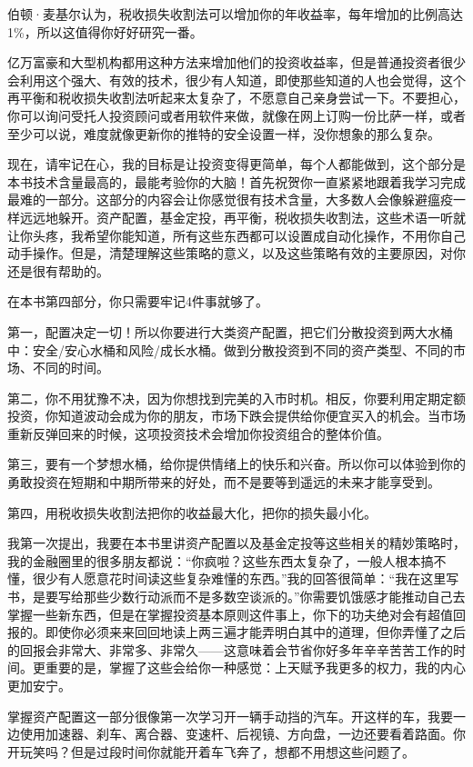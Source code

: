 伯顿·麦基尔认为，税收损失收割法可以增加你的年收益率，每年增加的比例高达1\%，所以这值得你好好研究一番。

亿万富豪和大型机构都用这种方法来增加他们的投资收益率，但是普通投资者很少会利用这个强大、有效的技术，很少有人知道，即使那些知道的人也会觉得，这个再平衡和税收损失收割法听起来太复杂了，不愿意自己亲身尝试一下。不要担心，你可以询问受托人投资顾问或者用软件来做，就像在网上订购一份比萨一样，或者至少可以说，难度就像更新你的推特的安全设置一样，没你想象的那么复杂。

现在，请牢记在心，我的目标是让投资变得更简单，每个人都能做到，这个部分是本书技术含量最高的，最能考验你的大脑！首先祝贺你一直紧紧地跟着我学习完成最难的一部分。这部分的内容会让你感觉很有技术含量，大多数人会像躲避瘟疫一样远远地躲开。资产配置，基金定投，再平衡，税收损失收割法，这些术语一听就让你头疼，我希望你能知道，所有这些东西都可以设置成自动化操作，不用你自己动手操作。但是，清楚理解这些策略的意义，以及这些策略有效的主要原因，对你还是很有帮助的。

在本书第四部分，你只需要牢记4件事就够了。

第一，配置决定一切！所以你要进行大类资产配置，把它们分散投资到两大水桶中：安全/安心水桶和风险/成长水桶。做到分散投资到不同的资产类型、不同的市场、不同的时间。

第二，你不用犹豫不决，因为你想找到完美的入市时机。相反，你要利用定期定额投资，你知道波动会成为你的朋友，市场下跌会提供给你便宜买入的机会。当市场重新反弹回来的时候，这项投资技术会增加你投资组合的整体价值。

第三，要有一个梦想水桶，给你提供情绪上的快乐和兴奋。所以你可以体验到你的勇敢投资在短期和中期所带来的好处，而不是要等到遥远的未来才能享受到。

第四，用税收损失收割法把你的收益最大化，把你的损失最小化。

我第一次提出，我要在本书里讲资产配置以及基金定投等这些相关的精妙策略时，我的金融圈里的很多朋友都说：“你疯啦？这些东西太复杂了，一般人根本搞不懂，很少有人愿意花时间读这些复杂难懂的东西。”我的回答很简单：“我在这里写书，是要写给那些少数行动派而不是多数空谈派的。”你需要饥饿感才能推动自己去掌握一些新东西，但是在掌握投资基本原则这件事上，你下的功夫绝对会有超值回报的。即使你必须来来回回地读上两三遍才能弄明白其中的道理，但你弄懂了之后的回报会非常大、非常多、非常久——这意味着会节省你好多年辛辛苦苦工作的时间。更重要的是，掌握了这些会给你一种感觉：上天赋予我更多的权力，我的内心更加安宁。

掌握资产配置这一部分很像第一次学习开一辆手动挡的汽车。开这样的车，我要一边使用加速器、刹车、离合器、变速杆、后视镜、方向盘，一边还要看着路面。你开玩笑吗？但是过段时间你就能开着车飞奔了，想都不用想这些问题了。

